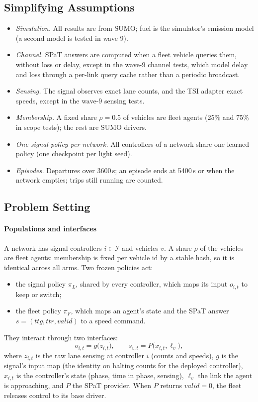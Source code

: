 \subsection{Simplifying Assumptions}
\begin{itemize}\setlength\itemsep{1pt}
\item \emph{Simulation.} All results are from SUMO; fuel is the simulator's emission model (a second model is tested in wave 9).
\item \emph{Channel.} SPaT answers are computed when a fleet vehicle queries them, without loss or delay, except in the wave-9 channel tests, which model
delay and loss through a per-link query cache rather than a periodic broadcast.
\item \emph{Sensing.} The signal observes exact lane counts, and the TSI adapter exact speeds, except in the wave-9 sensing tests.
\item \emph{Membership.} A fixed share $\rho=0.5$ of vehicles are fleet agents (25\% and 75\% in scope tests); the rest are SUMO drivers.
\item \emph{One signal policy per network.} All controllers of a network share one learned policy (one checkpoint per light seed).
\item \emph{Episodes.} Departures over 3600\,s; an episode ends at 5400\,s or when the network empties; trips still running are counted.
\end{itemize}
\subsection{Problem Setting}\label{sec:setting}
\paragraph{Populations and interfaces} A network has signal controllers $i\in\mathcal I$ and vehicles $v$. A share $\rho$ of the vehicles
are fleet agents: membership is fixed per vehicle id by a stable hash, so it is identical across all arms. Two frozen policies act:
\begin{itemize}\setlength\itemsep{0pt}
\item the signal policy $\pi_L$, shared by every controller, which maps its input $o_{i,t}$ to keep or switch;
\item the fleet policy $\pi_F$, which maps an agent's state and the SPaT answer $s=(\mathit{ttg},\mathit{ttr},\mathit{valid})$ to a speed
command.
\end{itemize}
They interact through two interfaces:
\begin{equation}
o_{i,t} = g\big(z_{i,t}\big), \qquad s_{v,t} = P\big(x_{i,t}, \ell_v\big),
\end{equation}
where $z_{i,t}$ is the raw lane sensing at controller $i$ (counts and speeds), $g$ is the signal's input map (the identity on halting
counts for the deployed controller), $x_{i,t}$ is the controller's state (phase, time in phase, sensing), $\ell_v$ the link the agent is
approaching, and $P$ the SPaT provider. When $P$ returns $\mathit{valid}=0$, the fleet releases control to its base driver.
